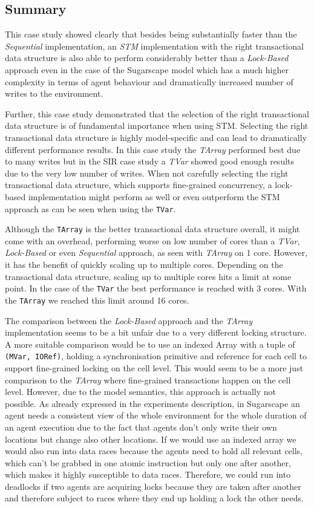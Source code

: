 \subsection{Summary}
This case study showed clearly that besides being substantially faster than the \textit{Sequential} implementation, an \textit{STM} implementation with the right transactional data structure is also able to perform considerably better than a \textit{Lock-Based} approach even in the case of the Sugarscape model which has a much higher complexity in terms of agent behaviour and dramatically increased number of writes to the environment.

Further, this case study demonstrated that the selection of the right transactional data structure is of fundamental importance when using STM. Selecting the right transactional data structure is highly model-specific and can lead to dramatically different performance results. In this case study the \textit{TArray} performed best due to many writes but in the SIR case study a \textit{TVar} showed good enough results due to the very low number of writes. When not carefully selecting the right transactional data structure, which supports fine-grained concurrency, a lock-based implementation might perform as well or even outperform the STM approach as can be seen when using the \texttt{TVar}.

Although the \texttt{TArray} is the better transactional data structure overall, it might come with an overhead, performing worse on low number of cores than a \textit{TVar}, \textit{Lock-Based} or even \textit{Sequential} approach, as seen with \textit{TArray} on 1 core. However, it has the benefit of quickly scaling up to multiple cores. Depending on the transactional data structure, scaling up to multiple cores hits a limit at some point. In the case of the \texttt{TVar} the best performance is reached with 3 cores. With the \texttt{TArray} we reached this limit around 16 cores.

The comparison between the \textit{Lock-Based} approach and the \textit{TArray} implementation seems to be a bit unfair due to a very different locking structure. A more suitable comparison would be to use an indexed Array with a tuple of \texttt{(MVar, IORef)}, holding a synchronisation primitive and reference for each cell to support fine-grained locking on the cell level. This would seem to be a more just comparison to the \textit{TArray} where fine-grained transactions happen on the cell level. However, due to the model semantics, this approach is actually not possible. As already expressed in the experiments description, in Sugarscape an agent needs a consistent view of the whole environment for the whole duration of an agent execution due to the fact that agents don't only write their own locations but change also other locations. If we would use an indexed array we would also run into data races because the agents need to hold all relevant cells, which can't be grabbed in one atomic instruction but only one after another, which makes it highly susceptible to data races. Therefore, we could run into deadlocks if two agents are acquiring locks because they are taken after another and therefore subject to races where they end up holding a lock the other needs.